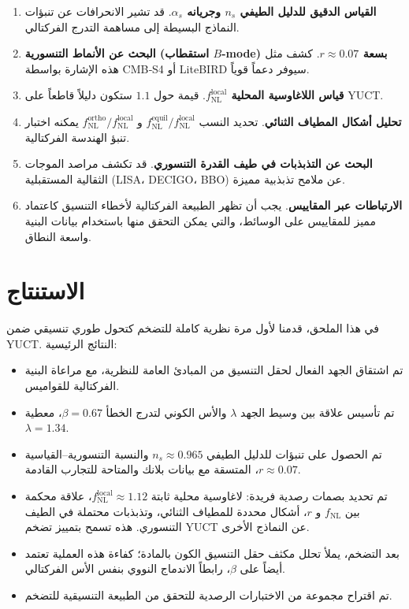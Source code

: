 \documentclass[11pt,a4paper]{article}
\theoremstyle{remark}
\begin{document}
	\begin{enumerate}
		\item \textbf{القياس الدقيق للدليل الطيفي $n_s$ وجريانه $\alpha_s$}. قد تشير الانحرافات عن تنبؤات النماذج البسيطة إلى مساهمة التدرج الفركتالي.
		\item \textbf{البحث عن الأنماط التنسورية (استقطاب $B$-mode) بسعة $r \approx 0.07$}. كشف مثل هذه الإشارة بواسطة CMB‑S4 أو LiteBIRD سيوفر دعماً قوياً.
		\item \textbf{قياس اللاغاوسية المحلية $f_{\text{NL}}^{\text{local}}$}. قيمة حول $1.1$ ستكون دليلاً قاطعاً على YUCT.
		\item \textbf{تحليل أشكال المطياف الثنائي}. تحديد النسب $f_{\text{NL}}^{\text{equil}}/f_{\text{NL}}^{\text{local}}$ و $f_{\text{NL}}^{\text{ortho}}/f_{\text{NL}}^{\text{local}}$ يمكنه اختبار تنبؤ الهندسة الفركتالية.
		\item \textbf{البحث عن التذبذبات في طيف القدرة التنسوري}. قد تكشف مراصد الموجات الثقالية المستقبلية (LISA، DECIGO، BBO) عن ملامح تذبذبية مميزة.
		\item \textbf{الارتباطات عبر المقاييس}. يجب أن تظهر الطبيعة الفركتالية لأخطاء التنسيق كاعتماد مميز للمقاييس على الوسائط، والتي يمكن التحقق منها باستخدام بيانات البنية واسعة النطاق.
	\end{enumerate}
	
	\section{الاستنتاج}
	\label{sec:conclusion}
	
	في هذا الملحق، قدمنا لأول مرة نظرية كاملة للتضخم كتحول طوري تنسيقي ضمن YUCT. النتائج الرئيسية:
	
	\begin{itemize}
		\item تم اشتقاق الجهد الفعال لحقل التنسيق من المبادئ العامة للنظرية، مع مراعاة البنية الفركتالية للقواميس.
		\item تم تأسيس علاقة بين وسيط الجهد $\lambda$ والأس الكوني لتدرج الخطأ $\beta = 0.67$، معطية $\lambda = 1.34$.
		\item تم الحصول على تنبؤات للدليل الطيفي $n_s \approx 0.965$ والنسبة التنسورية–القياسية $r \approx 0.07$، المتسقة مع بيانات بلانك والمتاحة للتجارب القادمة.
		\item تم تحديد بصمات رصدية فريدة: لاغاوسية محلية ثابتة $f_{\text{NL}}^{\text{local}} \approx 1.12$، علاقة محكمة بين $f_{\text{NL}}$ و $r$، أشكال محددة للمطياف الثنائي، وتذبذبات محتملة في الطيف التنسوري. هذه تسمح بتمييز تضخم YUCT عن النماذج الأخرى.
		\item بعد التضخم، يملأ تحلل مكثف حقل التنسيق الكون بالمادة؛ كفاءة هذه العملية تعتمد أيضاً على $\beta$، رابطاً الاندماج النووي بنفس الأس الفركتالي.
		\item تم اقتراح مجموعة من الاختبارات الرصدية للتحقق من الطبيعة التنسيقية للتضخم.
	\end{itemize}
	
\end{document}
